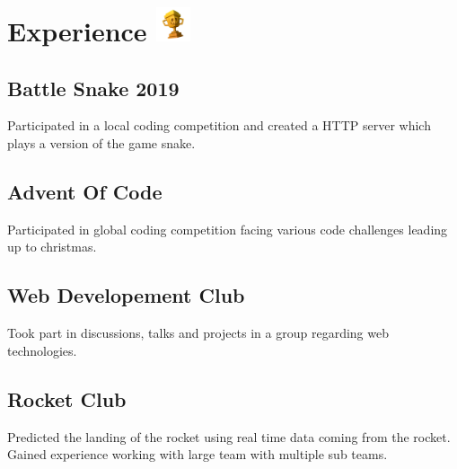 \documentclass{article}
\newcommand{\hrefColored}[3]{\href{#2}{\color{#1}{#3}}}
\begin{document}
\section{Experience \protect\includegraphics[height=1cm]{trophy.png}}

\subsection{Battle Snake 2019 \hrefColored{blue}{https://github.com/McRaeAlex/BattleSnake2019}{github.com/McRaeAlex/BattleSnake2019}}

Participated in a local coding competition and created a HTTP server
which plays a version of the game snake.

\subsection{Advent Of Code \hrefColored{blue}{https://github.com/McRaeAlex/AdventOfCode2018}{github.com/McRaeAlex/AdventOfCode2018}}

Participated in global coding competition facing various code challenges leading
up to christmas.

\subsection{Web Developement Club}

Took part in discussions, talks and projects in a group regarding web 
technologies.

\subsection{Rocket Club}

Predicted the landing of the rocket using real time data coming from the rocket.
Gained experience working with large team with multiple sub teams.
\end{document}
